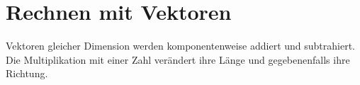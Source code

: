 \section{Rechnen mit Vektoren}
\label{sec:vector_algebra_operations}

Vektoren gleicher Dimension werden komponentenweise addiert und subtrahiert.
Die Multiplikation mit einer Zahl verändert ihre Länge und gegebenenfalls ihre
Richtung.



